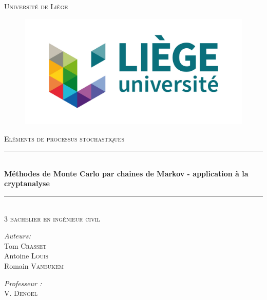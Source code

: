\documentclass[12pt]{article}
\newcommand{\HRule}{\rule{\linewidth}{0.5mm}}
\begin{document}
 


\begin{titlepage}


  \begin{sffamily}
  \begin{center}

   
    \textsc{\Large Université de Liège}\\[0.8cm]
    
    \begin{figure}[h!]
		\begin{center}
		\includegraphics[scale=1.2]{logoULG}\\[1cm]
		\end{center}
	\end{figure}
	

    \textsc{\Large Eléments de processus stochastiques}\\[1.1cm]

    
    \HRule \\[0.4cm]
    { \LARGE \bfseries Méthodes de Monte Carlo par chaines de Markov - application à la cryptanalyse \\[0.4cm] }

    \HRule \\[0.5cm]
    
    \textsc{3 bachelier en ingénieur civil} \\[2.5cm]

   \begin{minipage}{0.4\textwidth}
      \begin{flushleft} \large
        \emph{Auteurs:}\\
        Tom \textsc{Crasset} \\
        Antoine \textsc{Louis}  \\
        Romain \textsc{Vaneukem} \\
      \end{flushleft}
    \end{minipage}
    \begin{minipage}{0.4\textwidth}
      \begin{flushright} \large
        \emph{Professeur :}\\
        V. \textsc{Denoël}\\[0.5cm]
      

\end{flushright}
\end{minipage}
\end{center}
\end{sffamily}
\end{titlepage}
\end{document}
